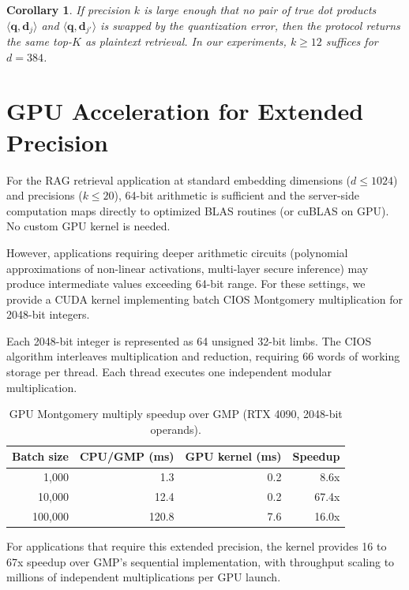 \documentclass[11pt]{article}
\newtheorem{corollary}[theorem]{Corollary}
\begin{document}
\begin{corollary}
\label{cor:precision-k}
If precision $k$ is large enough that no pair of true dot products $\langle \mathbf{q}, \mathbf{d}_j \rangle$ and $\langle \mathbf{q}, \mathbf{d}_{j'} \rangle$ is swapped by the quantization error, then the protocol returns the same top-$K$ as plaintext retrieval. In our experiments, $k \geq 12$ suffices for $d = 384$.
\end{corollary}


\section{GPU Acceleration for Extended Precision}
\label{sec:gpu}

For the RAG retrieval application at standard embedding dimensions ($d \leq 1024$) and precisions ($k \leq 20$), 64-bit arithmetic is sufficient and the server-side computation maps directly to optimized BLAS routines (or cuBLAS on GPU). No custom GPU kernel is needed.

However, applications requiring deeper arithmetic circuits (polynomial approximations of non-linear activations, multi-layer secure inference) may produce intermediate values exceeding 64-bit range. For these settings, we provide a CUDA kernel implementing batch CIOS Montgomery multiplication for 2048-bit integers.

Each 2048-bit integer is represented as 64 unsigned 32-bit limbs. The CIOS algorithm interleaves multiplication and reduction, requiring 66 words of working storage per thread. Each thread executes one independent modular multiplication.

\begin{table}[h]
\centering
\caption{GPU Montgomery multiply speedup over GMP (RTX 4090, 2048-bit operands).}
\label{tab:gpu-kernel}
\begin{tabular}{rrrr}
\toprule
Batch size & CPU/GMP (ms) & GPU kernel (ms) & Speedup \\
\midrule
1{,}000 & 1.3 & 0.2 & 8.6x \\
10{,}000 & 12.4 & 0.2 & 67.4x \\
100{,}000 & 120.8 & 7.6 & 16.0x \\
\bottomrule
\end{tabular}
\end{table}

For applications that require this extended precision, the kernel provides 16 to 67x speedup over GMP's sequential implementation, with throughput scaling to millions of independent multiplications per GPU launch.
\end{document}
